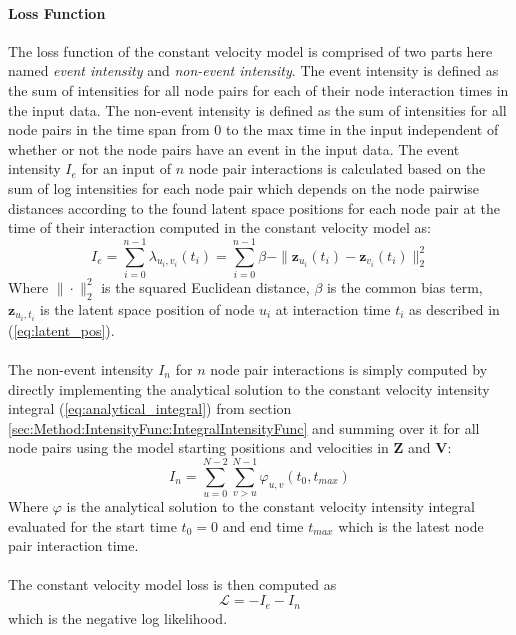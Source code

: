 \paragraph{Loss Function}
The loss function of the constant velocity model is comprised of two parts here named \textit{event intensity} and \textit{non-event intensity}. The event intensity is defined as the sum of intensities for all node pairs for each of their node interaction times in the input data. The non-event intensity is defined as the sum of intensities for all node pairs in the time span from 0 to the max time in the input independent of whether or not the node pairs have an event in the input data. 
The event intensity $I_e$ for an input of $n$ node pair interactions is calculated based on the sum of log intensities for each node pair which depends on the node pairwise distances according to the found latent space positions for each node pair at the time of their interaction computed in the constant velocity model as:
\begin{equation}
    I_e = \sum_{i = 0}^{n-1}  \lambda_{u_i , v_i}(t_i) =  \sum_{i =0}^{n-1} \beta - \rVert \textbf{z}_{u_i}(t_i) - \textbf{z}_{v_i}(t_i) \rVert_2^2
    \label{eq:Method:ProposedModel:event_intensity_calc}
\end{equation}
Where $\rVert \cdot \rVert_2^2$ is the squared Euclidean distance, $\beta$ is the common bias term, $\textbf{z}_{u_i , t_i}$ is the latent space position of node $u_i$ at interaction time $t_i$ as described in (\ref{eq:latent_pos}).
\\\\
The non-event intensity $I_n$ for $n$ node pair interactions is simply computed by directly implementing the analytical solution to the constant velocity intensity integral (\ref{eq:analytical_integral}) from section \ref{sec:Method:IntensityFunc:IntegralIntensityFunc} and summing over it for all node pairs using the model starting positions and velocities in $\textbf{Z}$ and $\textbf{V}$:
\begin{equation}
    I_n = \sum_{u=0}^{N-2} \sum_{v > u}^{N-1} \varphi_{u,v}(t_0,t_{max}) 
    \label{eq:Method:ProposedModel:nonevent_intensity_calc}
\end{equation}
Where $\varphi$ is the analytical solution to the constant velocity intensity integral evaluated for the start time $t_0=0$ and end time $t_{max}$ which is the latest node pair interaction time.
\\\\
The constant velocity model loss is then computed as
$$
\mathcal{L} = - I_e - I_n
$$
which is the negative log likelihood.


